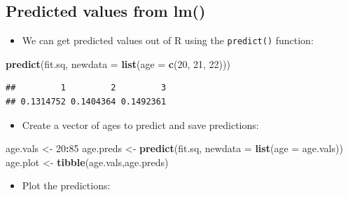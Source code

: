\documentclass[
]{article}
\newenvironment{Shaded}{\begin{snugshade}}{\end{snugshade}}
\newcommand{\AttributeTok}[1]{\textcolor[rgb]{0.13,0.29,0.53}{#1}}
\newcommand{\DecValTok}[1]{\textcolor[rgb]{0.00,0.00,0.81}{#1}}
\newcommand{\FunctionTok}[1]{\textcolor[rgb]{0.13,0.29,0.53}{\textbf{#1}}}
\newcommand{\NormalTok}[1]{#1}
\newcommand{\OtherTok}[1]{\textcolor[rgb]{0.56,0.35,0.01}{#1}}
\newcommand{\SpecialCharTok}[1]{\textcolor[rgb]{0.81,0.36,0.00}{\textbf{#1}}}
\providecommand{\tightlist}{%
  \setlength{\itemsep}{0pt}\setlength{\parskip}{0pt}}
\begin{document}
\subsection{Predicted values from lm()}\label{predicted-values-from-lm}

\begin{itemize}
\tightlist
\item
  We can get predicted values out of R using the \texttt{predict()}
  function:
\end{itemize}

\begin{Shaded}
\begin{Highlighting}[]
\FunctionTok{predict}\NormalTok{(fit.sq, }\AttributeTok{newdata =} \FunctionTok{list}\NormalTok{(}\AttributeTok{age =} \FunctionTok{c}\NormalTok{(}\DecValTok{20}\NormalTok{, }\DecValTok{21}\NormalTok{, }\DecValTok{22}\NormalTok{)))}
\end{Highlighting}
\end{Shaded}

\begin{verbatim}
##         1         2         3 
## 0.1314752 0.1404364 0.1492361
\end{verbatim}

\begin{itemize}
\tightlist
\item
  Create a vector of ages to predict and save predictions:
\end{itemize}

\begin{Shaded}
\begin{Highlighting}[]
\NormalTok{age.vals }\OtherTok{\textless{}{-}} \DecValTok{20}\SpecialCharTok{:}\DecValTok{85}
\NormalTok{age.preds }\OtherTok{\textless{}{-}} \FunctionTok{predict}\NormalTok{(fit.sq, }\AttributeTok{newdata =} \FunctionTok{list}\NormalTok{(}\AttributeTok{age =}\NormalTok{ age.vals))}
\NormalTok{age.plot }\OtherTok{\textless{}{-}} \FunctionTok{tibble}\NormalTok{(age.vals,age.preds)}
\end{Highlighting}
\end{Shaded}

\begin{itemize}
\tightlist
\item
  Plot the predictions:
\end{itemize}
\end{document}
